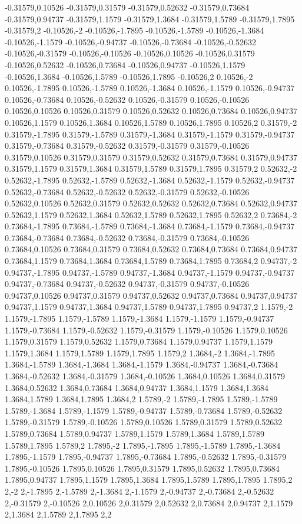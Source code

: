 -0.31579,0.10526
-0.31579,0.31579
-0.31579,0.52632
-0.31579,0.73684
-0.31579,0.94737
-0.31579,1.1579
-0.31579,1.3684
-0.31579,1.5789
-0.31579,1.7895
-0.31579,2
-0.10526,-2
-0.10526,-1.7895
-0.10526,-1.5789
-0.10526,-1.3684
-0.10526,-1.1579
-0.10526,-0.94737
-0.10526,-0.73684
-0.10526,-0.52632
-0.10526,-0.31579
-0.10526,-0.10526
-0.10526,0.10526
-0.10526,0.31579
-0.10526,0.52632
-0.10526,0.73684
-0.10526,0.94737
-0.10526,1.1579
-0.10526,1.3684
-0.10526,1.5789
-0.10526,1.7895
-0.10526,2
0.10526,-2
0.10526,-1.7895
0.10526,-1.5789
0.10526,-1.3684
0.10526,-1.1579
0.10526,-0.94737
0.10526,-0.73684
0.10526,-0.52632
0.10526,-0.31579
0.10526,-0.10526
0.10526,0.10526
0.10526,0.31579
0.10526,0.52632
0.10526,0.73684
0.10526,0.94737
0.10526,1.1579
0.10526,1.3684
0.10526,1.5789
0.10526,1.7895
0.10526,2
0.31579,-2
0.31579,-1.7895
0.31579,-1.5789
0.31579,-1.3684
0.31579,-1.1579
0.31579,-0.94737
0.31579,-0.73684
0.31579,-0.52632
0.31579,-0.31579
0.31579,-0.10526
0.31579,0.10526
0.31579,0.31579
0.31579,0.52632
0.31579,0.73684
0.31579,0.94737
0.31579,1.1579
0.31579,1.3684
0.31579,1.5789
0.31579,1.7895
0.31579,2
0.52632,-2
0.52632,-1.7895
0.52632,-1.5789
0.52632,-1.3684
0.52632,-1.1579
0.52632,-0.94737
0.52632,-0.73684
0.52632,-0.52632
0.52632,-0.31579
0.52632,-0.10526
0.52632,0.10526
0.52632,0.31579
0.52632,0.52632
0.52632,0.73684
0.52632,0.94737
0.52632,1.1579
0.52632,1.3684
0.52632,1.5789
0.52632,1.7895
0.52632,2
0.73684,-2
0.73684,-1.7895
0.73684,-1.5789
0.73684,-1.3684
0.73684,-1.1579
0.73684,-0.94737
0.73684,-0.73684
0.73684,-0.52632
0.73684,-0.31579
0.73684,-0.10526
0.73684,0.10526
0.73684,0.31579
0.73684,0.52632
0.73684,0.73684
0.73684,0.94737
0.73684,1.1579
0.73684,1.3684
0.73684,1.5789
0.73684,1.7895
0.73684,2
0.94737,-2
0.94737,-1.7895
0.94737,-1.5789
0.94737,-1.3684
0.94737,-1.1579
0.94737,-0.94737
0.94737,-0.73684
0.94737,-0.52632
0.94737,-0.31579
0.94737,-0.10526
0.94737,0.10526
0.94737,0.31579
0.94737,0.52632
0.94737,0.73684
0.94737,0.94737
0.94737,1.1579
0.94737,1.3684
0.94737,1.5789
0.94737,1.7895
0.94737,2
1.1579,-2
1.1579,-1.7895
1.1579,-1.5789
1.1579,-1.3684
1.1579,-1.1579
1.1579,-0.94737
1.1579,-0.73684
1.1579,-0.52632
1.1579,-0.31579
1.1579,-0.10526
1.1579,0.10526
1.1579,0.31579
1.1579,0.52632
1.1579,0.73684
1.1579,0.94737
1.1579,1.1579
1.1579,1.3684
1.1579,1.5789
1.1579,1.7895
1.1579,2
1.3684,-2
1.3684,-1.7895
1.3684,-1.5789
1.3684,-1.3684
1.3684,-1.1579
1.3684,-0.94737
1.3684,-0.73684
1.3684,-0.52632
1.3684,-0.31579
1.3684,-0.10526
1.3684,0.10526
1.3684,0.31579
1.3684,0.52632
1.3684,0.73684
1.3684,0.94737
1.3684,1.1579
1.3684,1.3684
1.3684,1.5789
1.3684,1.7895
1.3684,2
1.5789,-2
1.5789,-1.7895
1.5789,-1.5789
1.5789,-1.3684
1.5789,-1.1579
1.5789,-0.94737
1.5789,-0.73684
1.5789,-0.52632
1.5789,-0.31579
1.5789,-0.10526
1.5789,0.10526
1.5789,0.31579
1.5789,0.52632
1.5789,0.73684
1.5789,0.94737
1.5789,1.1579
1.5789,1.3684
1.5789,1.5789
1.5789,1.7895
1.5789,2
1.7895,-2
1.7895,-1.7895
1.7895,-1.5789
1.7895,-1.3684
1.7895,-1.1579
1.7895,-0.94737
1.7895,-0.73684
1.7895,-0.52632
1.7895,-0.31579
1.7895,-0.10526
1.7895,0.10526
1.7895,0.31579
1.7895,0.52632
1.7895,0.73684
1.7895,0.94737
1.7895,1.1579
1.7895,1.3684
1.7895,1.5789
1.7895,1.7895
1.7895,2
2,-2
2,-1.7895
2,-1.5789
2,-1.3684
2,-1.1579
2,-0.94737
2,-0.73684
2,-0.52632
2,-0.31579
2,-0.10526
2,0.10526
2,0.31579
2,0.52632
2,0.73684
2,0.94737
2,1.1579
2,1.3684
2,1.5789
2,1.7895
2,2
